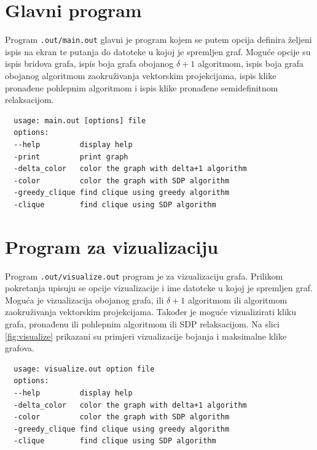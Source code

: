 \documentclass[diplomskirad]{fer}
\begin{document}
\section{Glavni program}
Program \verb|.out/main.out| glavni je program kojem se putem opcija definira željeni ispis na ekran te putanja do datoteke u kojoj je spremljen
graf. Moguće opcije su ispis bridova grafa, ispis boja grafa obojanog $\delta + 1$ algoritmom, ispis boja grafa obojanog algoritmom zaokruživanja
vektorskim projekcijama, ispis klike pronađene pohlepnim algoritmom i ispis klike pronađene semidefinitnom relaksacijom.

\begin{verbatim}
  usage: main.out [options] file
  options:
  --help         display help
  -print         print graph
  -delta_color   color the graph with delta+1 algorithm
  -color         color the graph with SDP algorithm
  -greedy_clique find clique using greedy algorithm
  -clique        find clique using SDP algorithm
\end{verbatim}

\section{Program za vizualizaciju}
Program \verb|.out/visualize.out| program je za vizualizaciju grafa. Prilikom pokretanja upisuju se opcije vizualizacije i ime datoteke u kojoj je 
spremljen graf. Moguća je vizualizacija obojanog grafa, ili $\delta + 1$ algoritmom ili algoritmom zaokruživanja vektorskim projekcijama. Također je
moguće vizualizirati kliku grafa, pronađenu ili pohlepnim algoritmom ili SDP relaksacijom. Na slici \ref{fig:visualize} prikazani su primjeri
vizualizacije bojanja i maksimalne klike grafova.

\begin{verbatim}
  usage: visualize.out option file
  options:
  --help         display help
  -delta_color   color the graph with delta+1 algorithm
  -color         color the graph with SDP algorithm
  -greedy_clique find clique using greedy algorithm
  -clique        find clique using SDP algorithm
\end{verbatim}
\end{document}
